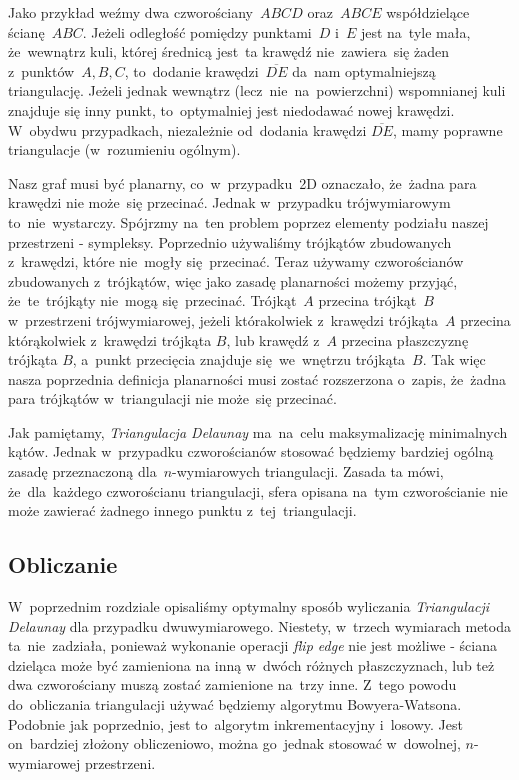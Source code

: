 \documentclass[skorowidz,autorrok,backref,xodstep,oswiadczenie]{wmimgr}
\begin{document}
Jako przykład weźmy dwa czworościany~$A B C D$ oraz~$A B C E$ współdzielące ścianę~$A B C$. Jeżeli odległość pomiędzy punktami~$D$ i~$E$ jest na~tyle mała, że~wewnątrz kuli, której średnicą jest~ta krawędź nie~zawiera~się żaden z~punktów~$A, B, C$, to~dodanie krawędzi~$\overline{D E}$ da~nam optymalniejszą triangulację. Jeżeli jednak wewnątrz (lecz~nie~na~powierzchni) wspomnianej kuli znajduje się inny punkt, to~optymalniej jest niedodawać nowej krawędzi. W~obydwu przypadkach, niezależnie od~dodania krawędzi $\overline{D E}$, mamy poprawne triangulacje (w~rozumieniu ogólnym).

Nasz graf musi być planarny, co~w~przypadku~2D oznaczało, że~żadna para krawędzi nie może~się przecinać. Jednak w~przypadku trójwymiarowym to~nie~wystarczy. Spójrzmy na~ten problem poprzez elementy podziału naszej przestrzeni - sympleksy. Poprzednio używaliśmy trójkątów zbudowanych z~krawędzi, które nie~mogły się~przecinać. Teraz używamy czworościanów zbudowanych z~trójkątów, więc jako zasadę planarności możemy przyjąć, że~te~trójkąty nie~mogą się~przecinać. Trójkąt~$A$ przecina trójkąt~$B$ w~przestrzeni trójwymiarowej, jeżeli którakolwiek z~krawędzi trójkąta~$A$ przecina którąkolwiek z~krawędzi trójkąta $B$, lub krawędź z~$A$ przecina płaszczyznę trójkąta $B$, a~punkt przecięcia znajduje się~we~wnętrzu trójkąta~$B$. Tak więc nasza poprzednia definicja planarności musi zostać rozszerzona o~zapis, że~żadna para trójkątów w~triangulacji nie może~się przecinać.

Jak pamiętamy, \emph{Triangulacja Delaunay} ma~na~celu maksymalizację minimalnych kątów. Jednak w~przypadku czworościanów stosować będziemy bardziej ogólną zasadę przeznaczoną dla~$n$-wymiarowych triangulacji. Zasada ta mówi, że~dla~każdego czworościanu triangulacji, sfera opisana na~tym czworościanie nie może zawierać żadnego innego punktu z~tej~triangulacji.

\subsection{Obliczanie}

W~poprzednim rozdziale opisaliśmy optymalny sposób wyliczania \emph{Triangulacji Delaunay} dla przypadku dwuwymiarowego. Niestety, w~trzech wymiarach metoda ta~nie~zadziała, ponieważ wykonanie operacji \emph{flip edge} nie jest możliwe - ściana dzieląca może być zamieniona na inną w~dwóch różnych płaszczyznach, lub też dwa czworościany muszą zostać zamienione na~trzy inne. Z~tego powodu do~obliczania triangulacji używać będziemy algorytmu Bowyera-Watsona. Podobnie jak poprzednio, jest to~algorytm inkrementacyjny i~losowy. Jest on~bardziej złożony obliczeniowo, można go~jednak stosować w~dowolnej, $n$-wymiarowej przestrzeni.
\end{document}

